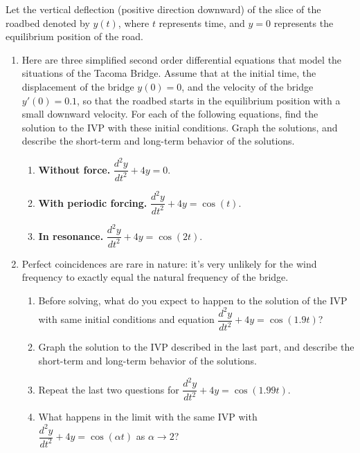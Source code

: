 \documentclass{article}
\theoremstyle{definition}
\begin{document}
Let the vertical deflection
(positive direction downward) of the slice of the roadbed denoted by $y(t)$, where $t$ represents time, and $y=0$ represents the equilibrium position of the road. 

\begin{enumerate}
\item
Here are three simplified second order differential equations that model the situations of the Tacoma Bridge. Assume that at the initial time, the displacement of the bridge $y(0)=0$, and the velocity of the bridge $y'(0)=0.1$,  so that the roadbed
starts in the equilibrium position with a small downward velocity. For each of the following equations, find the solution to the IVP with these initial conditions. Graph the solutions, and describe the short-term and long-term behavior of the solutions.
\begin{enumerate}
\item {\bf Without force.} $\dfrac{d^2y}{dt^2} + 4y = 0$.
\item {\bf With periodic forcing.} $\dfrac{d^2y}{dt^2} + 4y = \cos(t)$.
\item {\bf In resonance.} $\dfrac{d^2y}{dt^2} + 4y = \cos(2t)$.
\end{enumerate}

\item Perfect coincidences are rare in nature: it's very unlikely for the wind frequency to exactly equal the natural frequency of the bridge.
\begin{enumerate}
\item Before solving, what do you expect to happen to the solution of the IVP with same initial conditions and equation $\dfrac{d^2y}{dt^2} + 4y = \cos(1.9 t)$? 
\item Graph the solution to the IVP described in the last part, and describe the short-term and long-term behavior of the solutions.
\item Repeat the last two questions for $\dfrac{d^2y}{dt^2} + 4y = \cos(1.99 t)$.
\item What happens in the limit with the same IVP with $\dfrac{d^2y}{dt^2} + 4y = \cos(\alpha t)$ as $\alpha \to 2$?
\end{enumerate}
\end{enumerate}
\end{document}
